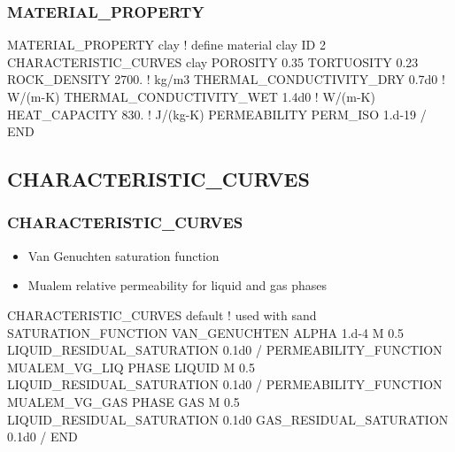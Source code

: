 \documentclass{beamer}
\newcommand\redcomment[1]{{{\color{red} #1}}}
\newcommand\bluecomment[1]{{{\color{blue} #1}}}
\newcommand\greencomment[1]{{{\color{green} #1}}}
\begin{document}
\begin{frame}[fragile]\frametitle{MATERIAL\_PROPERTY}

\begin{semiverbatim}
MATERIAL_PROPERTY clay \bluecomment{! define material} \greencomment{clay}
  ID 2
  CHARACTERISTIC_CURVES clay
  POROSITY 0.35
  TORTUOSITY 0.23
  ROCK_DENSITY 2700. \bluecomment{! kg/m3}
  THERMAL_CONDUCTIVITY_DRY 0.7d0 \bluecomment{! W/(m-K)}
  THERMAL_CONDUCTIVITY_WET 1.4d0 \bluecomment{! W/(m-K)}
  HEAT_CAPACITY 830. \bluecomment{! J/(kg-K)}
  PERMEABILITY
    PERM_ISO 1.d-19
  /
END
\end{semiverbatim}

\end{frame}
\subsection{CHARACTERISTIC\_CURVES}

\begin{frame}\frametitle{CHARACTERISTIC\_CURVES}

\begin{itemize}\small
  \item Van Genuchten \redcomment{saturation function}
  \item Mualem \redcomment{relative permeability} for liquid and gas phases
\end{itemize}

\begin{semiverbatim}\small
CHARACTERISTIC_CURVES default \bluecomment{! used with} \greencomment{sand}
  SATURATION_FUNCTION VAN_GENUCHTEN
    ALPHA 1.d-4
    M 0.5
    LIQUID_RESIDUAL_SATURATION 0.1d0
  /
  PERMEABILITY_FUNCTION MUALEM_VG_LIQ
    PHASE LIQUID
    M 0.5
    LIQUID_RESIDUAL_SATURATION 0.1d0
  /
  PERMEABILITY_FUNCTION MUALEM_VG_GAS
    PHASE GAS
    M 0.5
    LIQUID_RESIDUAL_SATURATION 0.1d0
    GAS_RESIDUAL_SATURATION 0.1d0
  /
END
\end{semiverbatim}

\end{frame}
\end{document}
